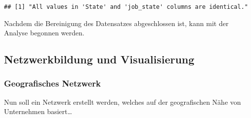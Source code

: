 \documentclass[
]{article}
\begin{document}
\begin{verbatim}
## [1] "All values in 'State' and 'job_state' columns are identical."
\end{verbatim}

Nachdem die Bereinigung des Datensatzes abgeschlossen ist, kann mit der
Analyse begonnen werden.

\subsection{Netzwerkbildung und
Visualisierung}\label{netzwerkbildung-und-visualisierung}

\subsubsection{Geografisches Netzwerk}\label{geografisches-netzwerk}

Nun soll ein Netzwerk erstellt werden, welches auf der geografischen
Nähe von Unternehmen basiert\ldots{}
\end{document}
